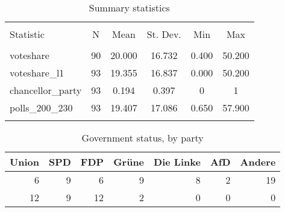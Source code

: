\documentclass[oneside,twocolumn,11pt,english]{article}
\begin{document}
\begin{table}[!htbp] \centering 
  \caption{Summary statistics} 
  \label{} 
\begin{tabular}{@{\extracolsep{5pt}}lccccc} 
\\[-1.8ex]\hline 
\hline \\[-1.8ex] 
Statistic & \multicolumn{1}{c}{N} & \multicolumn{1}{c}{Mean} & \multicolumn{1}{c}{St. Dev.} & \multicolumn{1}{c}{Min} & \multicolumn{1}{c}{Max} \\ 
\hline \\[-1.8ex] 
voteshare & 90 & 20.000 & 16.732 & 0.400 & 50.200 \\ 
voteshare\_l1 & 93 & 19.355 & 16.837 & 0.000 & 50.200 \\ 
chancellor\_party & 93 & 0.194 & 0.397 & 0 & 1 \\ 
polls\_200\_230 & 93 & 19.407 & 17.086 & 0.650 & 57.900 \\ 
\hline \\[-1.8ex] 
\end{tabular} 
\end{table} 

\begin{table*}[t!]
\centering
\caption{Government status, by party} 
\begingroup\small
\begin{tabular}{rrrrrrr}
  \toprule
Union & SPD & FDP & Grüne & Die Linke & AfD & Andere \\ 
  \midrule
6 & 9 & 6 & 9 & 8 & 2 & 19 \\ 
  12 & 9 & 12 & 2 & 0 & 0 & 0 \\ 
   \bottomrule
\end{tabular}
\endgroup
\end{table*}
\end{document}
